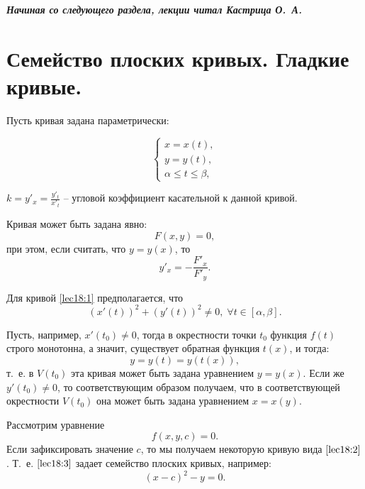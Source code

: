 \documentclass[../../main.tex]{subfiles}
\begin{document}
\bigskip

{\it \textbf{Начиная со следующего раздела, лекции читал Кастрица О.~А.}}

\bigskip

\section{Семейство плоских кривых. Гладкие кривые.}

Пусть кривая задана параметрически:

 \begin{equation} \begin{cases}
 \label{lec18:1}
x=x(t),\\
y=y(t), \\
\alpha \le t \le \beta,
\end{cases}
\end{equation}

$k = y'_x = \frac{y'_t}{x'_t}$ \--- угловой коэффициент 
касательной к данной кривой.

Кривая может быть задана явно:
\begin{equation}\label{lec18:2} F\left( x,y \right)  = 0, \end{equation}
при этом, если считать, что $y=y(x)$, то
\[ y'_x = - \frac{F'_x}{F'_y}.\]

Для кривой \eqref{lec18:1} предполагается, что
\[ \left( x' \left( t \right) \right)^2 + \left( y' \left( t \right) \right)^2 
\ne 0, \;  \forall t \in \left[ \alpha, \beta \right]. \]

Пусть, например, $x'\left( t_0 \right) \ne 0 $, тогда в окрестности точки 
$t_0$ 
функция $f\left( t \right) $ строго монотонна, а значит, существует обратная 
функция $t\left( x \right) $, и тогда:
\[ y = y \left( t \right) = y \left( t\left( x \right) \right), \]
т.~е. в $V \left( t_0 \right) $ эта кривая может быть задана уравнением
$y=y(x)$.
Если же $y'(t_0) \ne 0$, то соответствующим образом получаем, что в 
соответствующей окрестности $V \left( 
t_0 \right) $ она может быть задана уравнением $x=x\left( y \right) $.

Рассмотрим уравнение
\begin{equation} \label{lec18:3} f \left( x,y,c \right) = 0.  \end{equation}
Если зафиксировать значение $c$, то мы получаем некоторую кривую вида 
$\eqref{lec18:2}$. Т.~е. $\eqref{lec18:3}$ задает семейство плоских кривых, 
например:
\[ \left( x-c \right)^2 - y = 0. \]
\end{document}
